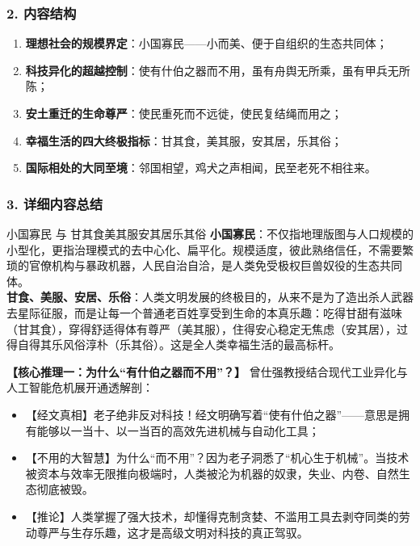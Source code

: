 \subsubsection{2. 内容结构}
\begin{enumerate}
    \item \textbf{理想社会的规模界定}：小国寡民——小而美、便于自组织的生态共同体；
    \item \textbf{科技异化的超越控制}：使有什伯之器而不用，虽有舟舆无所乘，虽有甲兵无所陈；
    \item \textbf{安土重迁的生命尊严}：使民重死而不远徙，使民复结绳而用之；
    \item \textbf{幸福生活的四大终极指标}：甘其食，美其服，安其居，乐其俗；
    \item \textbf{国际相处的大同至境}：邻国相望，鸡犬之声相闻，民至老死不相往来。
\end{enumerate}

\subsubsection{3. 详细内容总结}

\begin{ConceptBox}{小国寡民 与 甘其食美其服安其居乐其俗}
\textbf{小国寡民}：不仅指地理版图与人口规模的小型化，更指治理模式的去中心化、扁平化。规模适度，彼此熟络信任，不需要繁琐的官僚机构与暴政机器，人民自治自洽，是人类免受极权巨兽奴役的生态共同体。\\
\textbf{甘食、美服、安居、乐俗}：人类文明发展的终极目的，从来不是为了造出杀人武器去星际征服，而是让每一个普通老百姓享受到生命的本真乐趣：吃得甘甜有滋味（甘其食），穿得舒适得体有尊严（美其服），住得安心稳定无焦虑（安其居），过得自得其乐风俗淳朴（乐其俗）。这是全人类幸福生活的最高标杆。
\end{ConceptBox}

\noindent\textbf{【核心推理一：为什么“有什伯之器而不用”？】}
曾仕强教授结合现代工业异化与人工智能危机展开通透解剖：
\begin{itemize}
    \item 【经文真相】老子绝非反对科技！经文明确写着“使有什伯之器”——意思是拥有能够以一当十、以一当百的高效先进机械与自动化工具；
    \item 【不用的大智慧】为什么“而不用”？因为老子洞悉了“机心生于机械”。当技术被资本与效率无限推向极端时，人类被沦为机器的奴隶，失业、内卷、自然生态彻底被毁。
    \item 【推论】人类掌握了强大技术，却懂得克制贪婪、不滥用工具去剥夺同类的劳动尊严与生存乐趣，这才是高级文明对科技的真正驾驭。
\end{itemize}

